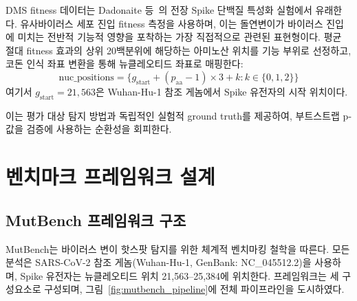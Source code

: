 DMS fitness 데이터는 Dadonaite 등~\cite{dadonaite2023dms}의 전장 Spike 단백질 특성화 실험에서 유래한다.
유사바이러스 세포 진입 fitness 측정을 사용하며, 이는 돌연변이가 바이러스 진입에 미치는 전반적 기능적 영향을 포착하는 가장 직접적으로 관련된 표현형이다.
평균 절대 fitness 효과의 상위 20백분위에 해당하는 아미노산 위치를 기능 부위로 선정하고, 코돈 인식 좌표 변환을 통해 뉴클레오티드 좌표로 매핑한다:
\begin{equation}
\text{nuc\_positions} = \{g_{\text{start}} + (p_{\text{aa}} - 1) \times 3 + k : k \in \{0, 1, 2\}\}
\label{eq:coordinate_transform}
\end{equation}
여기서 $g_{\text{start}} = 21{,}563$은 Wuhan-Hu-1 참조 게놈에서 Spike 유전자의 시작 위치이다.

이는 평가 대상 탐지 방법과 독립적인 실험적 ground truth를 제공하여, 부트스트랩 p-값을 검증에 사용하는 순환성을 회피한다.

\section{벤치마크 프레임워크 설계}
\label{sec:mutbench_methods}

\subsection{MutBench 프레임워크 구조}

MutBench는 바이러스 변이 핫스팟 탐지를 위한 체계적 벤치마킹 철학을 따른다.
모든 분석은 SARS-CoV-2 참조 게놈(Wuhan-Hu-1, GenBank: NC\_045512.2)을 사용하며, Spike 유전자는 뉴클레오티드 위치 21,563--25,384에 위치한다.
프레임워크는 세 구성요소로 구성되며, 그림~\ref{fig:mutbench_pipeline}에 전체 파이프라인을 도시하였다.

